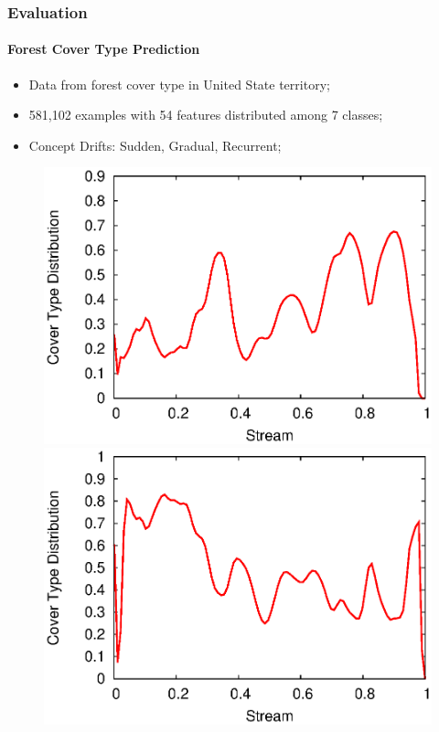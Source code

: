 \documentclass[14pt]{beamer}
\begin{document}
\begin{frame}
\frametitle{Evaluation}
\framesubtitle{Forest Cover Type Prediction}
\begin{itemize}
    \item Data from forest cover type in United State territory;
    \item 581,102 examples with 54 features distributed among 7 classes;
    \item Concept Drifts: Sudden, Gradual, Recurrent;
\end{itemize}
\begin{figure}[htp!]
\centering
\includegraphics[scale=0.3]{covtype_class_stream_1.eps}
\includegraphics[scale=0.3]{covtype_class_stream_2.eps}

\end{figure}
\end{frame}
\end{document}

